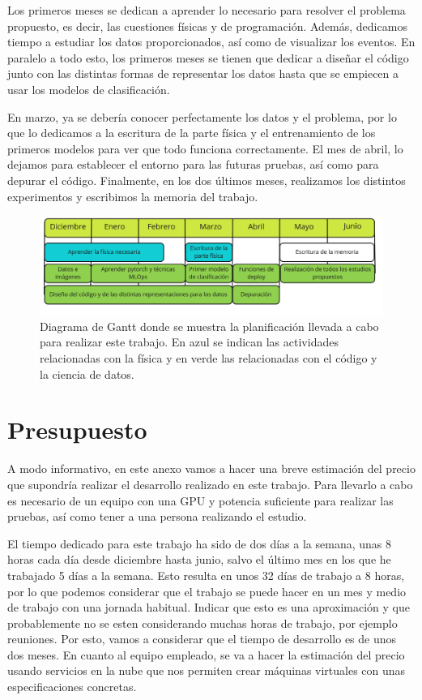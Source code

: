 \documentclass[a4paper,12pt,oneside,titlepage]{book}
\begin{document}
\begin{appendices}
  Los primeros meses se dedican a aprender lo necesario para resolver el problema propuesto, es decir, las cuestiones físicas y de programación. Además, dedicamos tiempo a estudiar los datos proporcionados, así como de visualizar los eventos. En paralelo a todo esto, los primeros meses se tienen que dedicar a diseñar el código junto con las distintas formas de representar los datos hasta que se empiecen a usar los modelos de clasificación.

  En marzo, ya se debería conocer perfectamente los datos y el problema, por lo que lo dedicamos a la escritura de la parte física y el entrenamiento de los primeros modelos para ver que todo funciona correctamente. El mes de abril, lo dejamos para establecer el entorno para las futuras pruebas, así como para depurar el código. Finalmente, en los dos últimos meses, realizamos los distintos experimentos y escribimos la memoria del trabajo.
  \begin{figure}[h!]
    \centering
    \includegraphics[scale=0.30, center]{gant.pdf}
    \caption{Diagrama de Gantt donde se muestra la planificación llevada a cabo para realizar este trabajo. En azul se indican las actividades relacionadas con la física y en verde las relacionadas con el código y la ciencia de datos.}
    \label{fig:gant}
  \end{figure}
  
  \section{Presupuesto}
  A modo informativo, en este anexo vamos a hacer una breve estimación del precio que supondría realizar el desarrollo realizado en este trabajo. Para llevarlo a cabo es necesario de un equipo con una GPU y potencia suficiente para realizar las pruebas, así como tener a una persona realizando el estudio.
  
  El tiempo dedicado para este trabajo ha sido de dos días a la semana, unas 8 horas cada día desde diciembre hasta junio, salvo el último mes en los que he trabajado 5 días a la semana. Esto resulta en unos 32 días de trabajo a 8 horas, por lo que podemos considerar que el trabajo se puede hacer en un mes y medio de trabajo con una jornada habitual. Indicar que esto es una aproximación y que probablemente no se esten considerando muchas horas de trabajo, por ejemplo reuniones. Por esto, vamos a considerar que el tiempo de desarrollo es de unos dos meses. En cuanto al equipo empleado, se va a hacer la estimación del precio usando servicios en la nube que nos permiten crear máquinas virtuales con unas especificaciones concretas.


\end{appendices}
\end{document}

